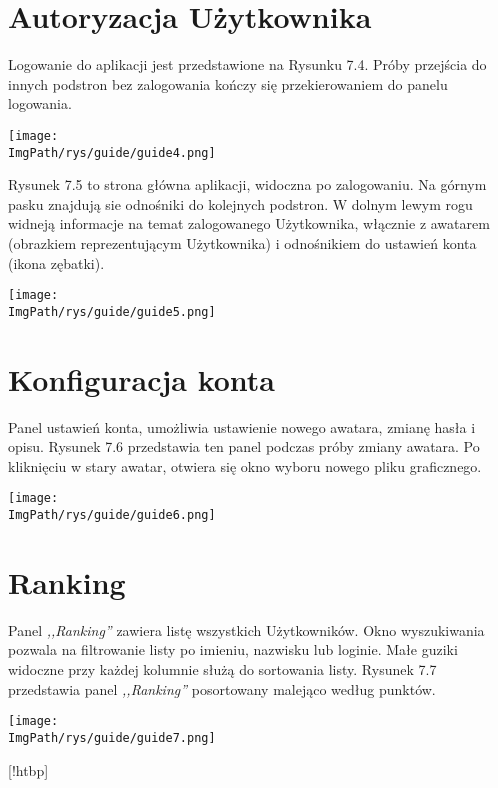 \documentclass[a4paper,12pt,twoside,openany]{report}
\newcommand{\ImgPath}{.}
\begin{document}
\section{Autoryzacja Użytkownika}
Logowanie do aplikacji jest przedstawione na Rysunku 7.4. Próby przejścia do innych podstron bez zalogowania kończy się przekierowaniem do panelu logowania.
								\begin{sidewaysfigure}[!htbp]
									\begin{center}
										\centering
										\texttt{[image: \\ImgPath/rys/guide/guide4.png]}
									\end{center}
									\caption{}
									\label{UMLTS}
								\end{sidewaysfigure}
Rysunek 7.5 to strona główna aplikacji, widoczna po zalogowaniu. Na górnym pasku znajdują sie odnośniki do kolejnych podstron. W dolnym lewym rogu widneją informacje na temat zalogowanego Użytkownika, włącznie z awatarem (obrazkiem reprezentującym Użytkownika) i odnośnikiem do ustawień konta (ikona zębatki).
								\begin{sidewaysfigure}[!htbp]
									\begin{center}
										\centering
										\texttt{[image: \\ImgPath/rys/guide/guide5.png]}
									\end{center}
									\caption{}
									\label{UMLTS}
								\end{sidewaysfigure}

\section{Konfiguracja konta}
Panel ustawień konta, umożliwia ustawienie nowego awatara, zmianę hasła i opisu. Rysunek 7.6 przedstawia ten panel podczas próby zmiany awatara. Po kliknięciu w stary awatar, otwiera się okno wyboru nowego pliku graficznego.
								\begin{sidewaysfigure}[!htbp]
									\begin{center}
										\centering
										\texttt{[image: \\ImgPath/rys/guide/guide6.png]}
									\end{center}
									\caption{}
									\label{UMLTS}
								\end{sidewaysfigure}
\section{Ranking}
Panel \textit{,,Ranking''} zawiera listę wszystkich Użytkowników. Okno wyszukiwania pozwala na filtrowanie listy po imieniu, nazwisku lub loginie. Małe guziki widoczne przy każdej kolumnie służą do sortowania listy. Rysunek 7.7 przedstawia panel \textit{,,Ranking''} posortowany malejąco według punktów.
								\begin{sidewaysfigure}[!htbp]
									\begin{center}
										\centering
										\texttt{[image: \\ImgPath/rys/guide/guide7.png]}
									\end{center}
									\caption{}
									\label{UMLTS}
								\end{sidewaysfigure}[!htbp]
\end{document}
